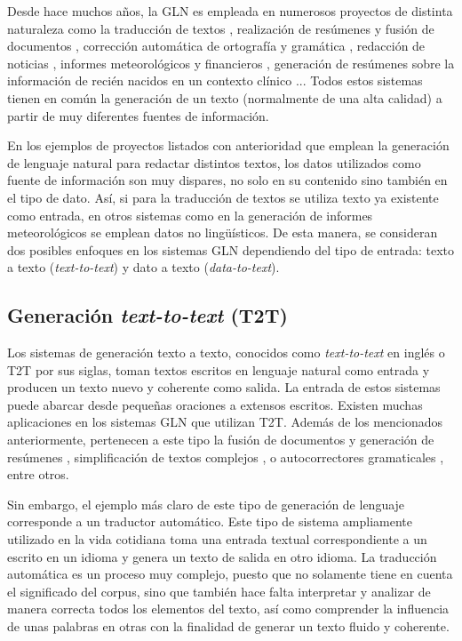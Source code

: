 Desde hace muchos años, la GLN es empleada en numerosos proyectos de distinta naturaleza como la traducción de textos \citep{Cho2014LearningPR}, realización de resúmenes y fusión de documentos \citep{clarke2010discourse}, corrección automática de ortografía y gramática \citep{islam2018bangla}, redacción de noticias \citep{leppanen2017data}, informes meteorológicos \citep{sripada2014case} y financieros \citep{ren2021hybrid}, generación de resúmenes sobre la información de recién nacidos en un contexto clínico \citep{BabyTalk}... Todos estos sistemas tienen en común la generación de un texto (normalmente de una alta calidad) a partir de muy diferentes fuentes de información.

En los ejemplos de proyectos listados con anterioridad que emplean la generación de lenguaje natural para redactar distintos textos, los datos utilizados como fuente de información son muy dispares, no solo en su contenido sino también en el tipo de dato. Así, si para la traducción de textos se utiliza texto ya existente como entrada, en otros sistemas como en la generación de informes meteorológicos se emplean datos no lingüísticos. De esta manera, se consideran dos posibles enfoques en los sistemas GLN dependiendo del tipo de entrada: texto a texto (\textit{text-to-text}) y dato a texto (\textit{data-to-text}).

\subsection{Generación \textit{text-to-text} (T2T)}
Los sistemas de generación texto a texto, conocidos como \textit{text-to-text} en inglés o T2T por sus siglas, toman textos escritos en lenguaje natural como entrada y producen un texto nuevo y coherente como salida. La entrada de estos sistemas puede abarcar desde pequeñas oraciones a extensos escritos. Existen muchas aplicaciones en los sistemas GLN que utilizan T2T. Además de los mencionados anteriormente, pertenecen a este tipo la fusión de documentos y generación de resúmenes \citep{clarke2010discourse}, simplificación de textos complejos \citep{sulem2018simple}, o autocorrectores gramaticales \citep{Ge2019AutomaticGE}, entre otros. 

Sin embargo, el ejemplo más claro de este tipo de generación de lenguaje corresponde a un traductor automático. Este tipo de sistema ampliamente utilizado en la vida cotidiana toma una entrada textual correspondiente a un escrito en un idioma y genera un texto de salida en otro idioma. La traducción automática es un proceso muy complejo, puesto que no solamente tiene en cuenta el significado del corpus, sino que también hace falta interpretar y analizar de manera correcta todos los elementos del texto, así como comprender la influencia de unas palabras en otras con la finalidad de  generar un texto fluido y coherente. 

